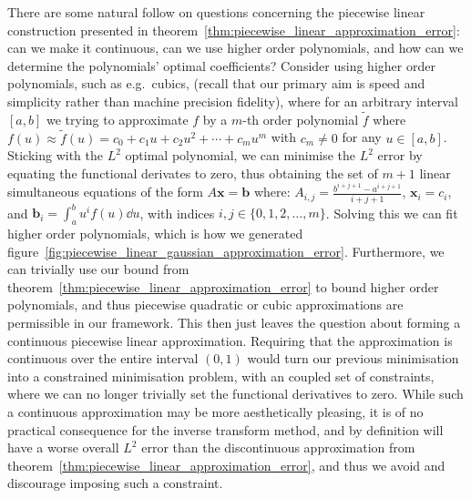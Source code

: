 \documentclass[manuscript,review]{acmart}
\begin{document}
There are some natural follow on questions concerning the piecewise linear construction presented in theorem~\ref{thm:piecewise_linear_approximation_error}: can we make it continuous, can we use higher order polynomials, and how can we determine the polynomials' optimal coefficients? Consider using higher order polynomials, such as e.g.\ cubics, (recall that our primary aim is speed and simplicity rather than machine precision fidelity), where for an arbitrary interval $ [a,b] $ we trying to approximate $ f $ by a $ m $-th order polynomial $ \tilde{f} $ where $ f(u) \approx \tilde{f}(u) = c_0 + c_1 u + c_2 u^2 + \cdots + c_m u^m $ with $ c_m \neq 0 $ for any $ u \in [a,b] $. Sticking with the $ L^2 $ optimal polynomial, we can minimise the $ L^2 $ error by equating the functional derivates to zero, thus obtaining the set of $ m + 1 $ linear simultaneous equations of the form $ A\bm{x} = \bm{b} $ where: $ A_{i,j} = \tfrac{b^{i+j+1} - a^{i+j+1}}{i+j+1} $, $ \bm{x}_i = c_i $, and $ \bm{b}_{i} = \int_{a}^{b} u^i f(u) \dd{u} $, with indices $ i,j \in \{0,1,2,\ldots,m\} $. Solving this we can fit higher order polynomials, which is how we generated figure~\ref{fig:piecewise_linear_gaussian_approximation_error}. Furthermore, we can trivially use our bound from theorem~\ref{thm:piecewise_linear_approximation_error} to bound higher order polynomials, and thus piecewise quadratic or cubic approximations are permissible in our framework. This then just leaves the question about forming a continuous piecewise linear approximation. Requiring that the approximation is continuous over the entire interval $ (0, 1) $ would turn our previous minimisation into a constrained minimisation problem, with an coupled set of constraints, where we can no longer trivially set the functional derivatives to zero.  While such a continuous approximation may be more aesthetically pleasing, it is of no practical consequence for the inverse transform method, and by definition will have a worse overall $ L^2 $ error than the discontinuous approximation from theorem~\ref{thm:piecewise_linear_approximation_error}, and thus we avoid and discourage imposing such a constraint. 
\end{document}
